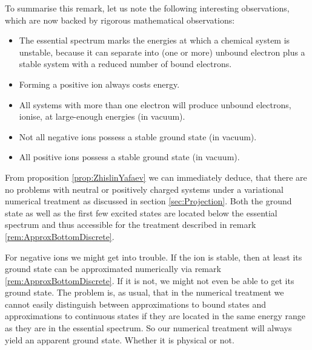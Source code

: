 \begin{rem}
	To summarise this remark, let us note the following
	interesting observations,
	which are now backed by rigorous mathematical observations:
	\begin{itemize}
		\item The essential spectrum marks the energies
			at which a chemical system is unstable,
			because it can separate into (one or more) unbound electron
			plus a stable system with a
			reduced number of bound electrons.
		\item Forming a positive ion always costs energy.
		\item All systems with more than one electron
			will produce unbound electrons,
			\ie ionise, at large-enough energies (in vacuum).
		\item Not all negative ions possess a stable ground state (in vacuum).
		\item All positive ions possess a stable ground state (in vacuum).
	\end{itemize}
\end{rem}

\begin{rem}
	\label{rem:ElectronicTISENumerical}
	From proposition \ref{prop:ZhislinYafaev}
	we can immediately deduce,
	that there are no problems with neutral or positively charged
	systems under a variational numerical treatment as discussed
	in section \vref{sec:Projection}.
	Both the ground state as well as the first few
	excited states are located below the
	essential spectrum and thus accessible for the treatment
	described in remark \vref{rem:ApproxBottomDiscrete}.

	For negative ions we might get into trouble.
	If the ion is stable,
	then at least its ground state can be approximated
	numerically via remark \ref{rem:ApproxBottomDiscrete}.
	If it is not, we might not even be able to get
	its ground state.
	The problem is, as usual, that in the numerical treatment
	we cannot easily distinguish between approximations
	to bound states and approximations to continuous states
	if they are located in the same energy range
	as they are in the essential spectrum.
	So our numerical treatment will always yield
	an apparent ground state.
	Whether it is physical or not.
\end{rem}
